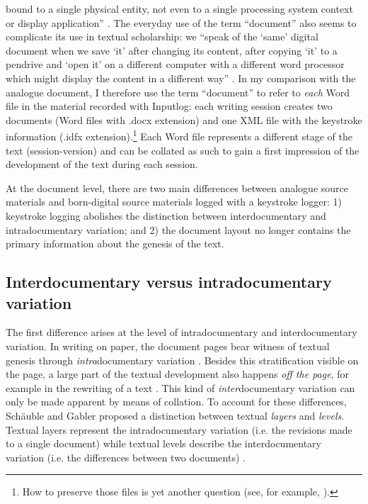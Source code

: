 \begin{paper}
bound to a single physical entity, not even to a single processing
system context or display application'' \citep[397]{ries_rationale_2018}. The everyday
use of the term ``document'' also seems to complicate its use in textual
scholarship: we ``speak of the `same' digital document when we save `it'
after changing its content, after copying `it' to a pendrive and `open
it' on a different computer with a different word processor which might
display the content in a different way'' \citep[397]{ries_rationale_2018}. In my
comparison with the analogue document, I therefore use the term
``document'' to refer to \emph{each} Word file in the material recorded
with Inputlog: each writing session creates two documents (Word files
with .docx extension) and one XML file with the keystroke information
(.idfx extension).\footnote{How to preserve those files is yet another
  question (see, for example, \citealt{kirschenbaum_digital_2010}).}
Each Word file represents a different stage of the text
(session-version) and can be collated as such to gain a first impression
of the development of the text during each session.

At the document level, there are two main differences between analogue
source materials and born-digital source materials logged with a
keystroke logger: 1) keystroke logging abolishes the distinction between
interdocumentary and intradocumentary variation; and 2) the document
layout no longer contains the primary information about the genesis of
the text.

\subsection{Interdocumentary versus intradocumentary variation}

The first difference arises at the level of intradocumentary and
interdocumentary variation. In writing on paper, the document pages bear
witness of textual genesis through \emph{intra}documentary variation \citep[165]{schauble_encodings_2018}. Besides this stratification visible on
the page, a large part of the textual development also happens \emph{off
the page}, for example in the rewriting of a text \citep[165]{schauble_encodings_2018}.
This kind of \emph{inter}documentary variation can only be made apparent
by means of collation. To account for these differences, Schäuble and
Gabler proposed a distinction between textual \emph{layers} and
\emph{levels}. Textual layers represent the intradocumentary variation
(i.e. the revisions made to a single document) while textual levels
describe the interdocumentary variation (i.e. the differences between two
documents) \citep[169]{schauble_encodings_2018}.


\end{paper}
